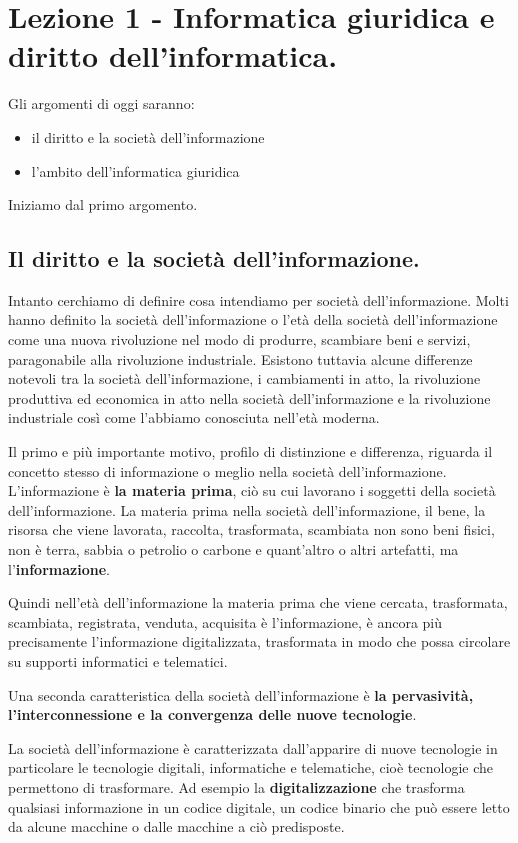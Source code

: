 \chapter{Lezione 1 - Informatica giuridica e diritto dell'informatica.}


Gli argomenti di oggi saranno:
\begin{itemize}
    \item il diritto e la società dell'informazione
    \item l'ambito dell'informatica giuridica
\end{itemize}
Iniziamo dal primo argomento. 
\section{Il diritto e la società dell'informazione.} Intanto cerchiamo di definire cosa intendiamo per società dell'informazione. Molti hanno definito la società dell'informazione o l'età della società dell'informazione come una nuova rivoluzione nel modo di produrre, scambiare beni e servizi, paragonabile alla rivoluzione industriale. Esistono tuttavia alcune differenze notevoli tra la società dell'informazione, i cambiamenti in atto, la rivoluzione produttiva ed economica in atto nella società dell'informazione e la rivoluzione industriale così come l'abbiamo conosciuta nell'età moderna.

Il primo e più importante motivo, profilo di distinzione e differenza, riguarda il concetto stesso di informazione o meglio nella società dell'informazione. L'informazione è \textbf{la materia prima}, ciò su cui lavorano i soggetti della società dell'informazione. 
La materia prima nella società dell'informazione, il bene, la risorsa che viene lavorata, raccolta, trasformata, scambiata non sono beni fisici, non è terra, sabbia o petrolio o carbone e quant'altro o altri artefatti, ma l'\textbf{informazione}.
 
Quindi nell'età dell'informazione la materia prima che viene cercata, trasformata, scambiata, registrata, venduta, acquisita è l'informazione, è ancora più precisamente l'informazione digitalizzata, trasformata in modo che possa circolare su supporti informatici e telematici. \par

Una seconda caratteristica della società dell'informazione è \textbf{la pervasività, l'interconnessione e la convergenza delle nuove tecnologie}.\par
La società dell'informazione è caratterizzata dall'apparire di nuove tecnologie in particolare le tecnologie digitali, informatiche e telematiche, cioè tecnologie che permettono di trasformare. Ad esempio la \textbf{digitalizzazione} che trasforma qualsiasi informazione in un codice digitale, un codice binario che può essere letto da alcune macchine o dalle macchine a ciò predisposte. 

